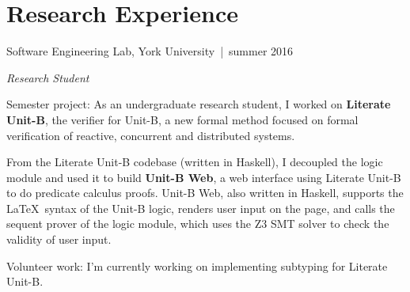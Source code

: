 \documentclass[12pt,letterpaper]{article}
\renewenvironment{itemize}{
  \begin{list}{}{
    \setlength{\leftmargin}{1.5em}
    \setlength{\itemsep}{0.25em}
    \setlength{\parskip}{0pt}
    \setlength{\parsep}{0.25em}
  }
}{
  \end{list}
}
\begin{document}
\section*{Research Experience}

\begin{itemize}
\item {\large Software Engineering Lab, } York University\, |\, {\small summer 2016}

  \textit{Research Student}

  \begin{itemize}
  \item Semester project: As an undergraduate research student, I
    worked on \textbf{Literate Unit-B}, the verifier for Unit-B, a new
    formal method focused on formal verification of reactive, concurrent
    and distributed systems.

    From the Literate Unit-B codebase (written in Haskell), I decoupled the
    logic module and used it to build \textbf{Unit-B Web}, a web interface using
    Literate Unit-B to do predicate calculus proofs. \linebreak Unit-B Web, also
    written in Haskell, supports the \LaTeX\ syntax of the Unit-B logic, renders
    user input on the page, and calls the sequent prover of the logic
    module, which uses the Z3 SMT solver to check the validity of user
    input.

  \item Volunteer work: I'm currently working on implementing subtyping for
    Literate Unit-B.
  \end{itemize}
  \end{itemize}
\end{document}
